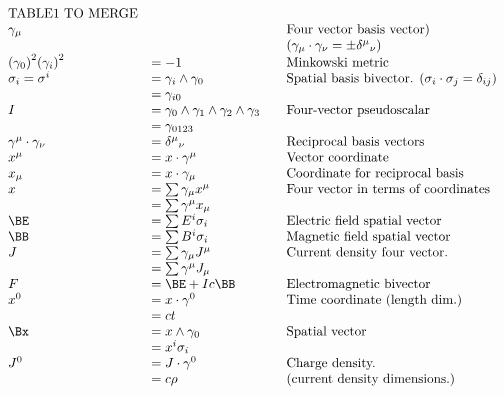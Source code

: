 \begin{equation*}
\begin{array}{l l l}
\mbox{TABLE1 TO MERGE} \\
\gamma_{\mu} & & \quad \mbox{Four vector basis vector)} \\
& & \quad \mbox{($\gamma_{\mu} \cdot \gamma_{\nu} = \pm {\delta^{\mu}}_{\nu}$)} \\
{(\gamma_0)}^2 {(\gamma_i)}^2 &= -1 & \quad \mbox{Minkowski metric} \\
\sigma_i = \sigma^i &= \gamma_{i} \wedge \gamma_0 & \quad \mbox{Spatial basis bivector. ($\sigma_i \cdot \sigma_j = \delta_{ij}$)} \\
                    &= \gamma_{i0} \\
I &= \gamma_{0} \wedge \gamma_1 \wedge \gamma_{2} \wedge \gamma_3 & \quad \mbox{Four-vector pseudoscalar} \\
  &= \gamma_{0123} \\
\gamma^{\mu} \cdot \gamma_{\nu} &= {\delta^{\mu}}_{\nu} & \quad \mbox{Reciprocal basis vectors} \\
x^{\mu} &= x \cdot \gamma^{\mu} & \quad \mbox{Vector coordinate} \\
x_{\mu} &= x \cdot \gamma_{\mu} & \quad \mbox{Coordinate for reciprocal basis} \\
x &= \sum \gamma_{\mu} x^{\mu} & \quad \mbox{Four vector in terms of coordinates} \\
  &= \sum \gamma^{\mu} x_{\mu} \\
\BE &= \sum E^i \sigma_i & \quad \mbox{Electric field spatial vector} \\
\BB &= \sum B^i \sigma_i & \quad \mbox{Magnetic field spatial vector} \\
J &= \sum \gamma_{\mu} J^{\mu} & \quad \mbox{Current density four vector.} \\
  &= \sum \gamma^{\mu} J_{\mu} \\
F &= \BE + I c \BB & \quad \mbox{Electromagnetic bivector} \\
x^{0} &= x \cdot \gamma^0 & \quad \mbox{Time coordinate (length dim.)} \\
      &= c t \\
\Bx &= x \wedge \gamma_0 & \quad \mbox{Spatial vector} \\
    &= x^i \sigma_i \\
J^{0} &= J \cdot \gamma^0 & \quad \mbox{Charge density.} \\
      &= c \rho & \quad \mbox{(current density dimensions.)} \\

\end{array}
\end{equation*}
